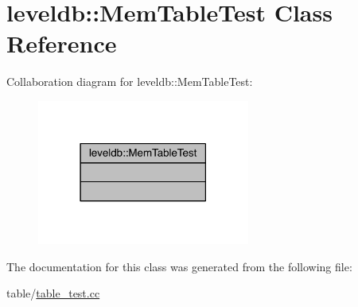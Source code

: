 \hypertarget{classleveldb_1_1_mem_table_test}{}\section{leveldb\+:\+:Mem\+Table\+Test Class Reference}
\label{classleveldb_1_1_mem_table_test}


Collaboration diagram for leveldb\+:\+:Mem\+Table\+Test\+:\nopagebreak
\begin{figure}[H]
\begin{center}
\leavevmode
\includegraphics[width=198pt]{classleveldb_1_1_mem_table_test__coll__graph}
\end{center}
\end{figure}


The documentation for this class was generated from the following file\+:\begin{DoxyCompactItemize}
\item 
table/\hyperlink{table__test_8cc}{table\+\_\+test.\+cc}\end{DoxyCompactItemize}
